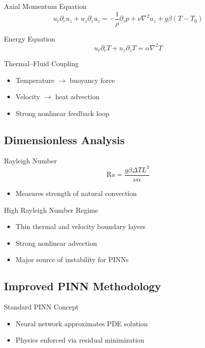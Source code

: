 \documentclass{beamer}
\begin{document}
\begin{frame}{Axial Momentum Equation}
\[
u_r \partial_r u_z + u_z \partial_z u_z =
-\frac{1}{\rho}\partial_z p
+ \nu\nabla^2 u_z
+ g\beta(T-T_0)
\]
\end{frame}

\begin{frame}{Energy Equation}
\[
u_r \partial_r T + u_z \partial_z T =
\alpha \nabla^2 T
\]
\end{frame}

\begin{frame}{Thermal--Fluid Coupling}
\begin{itemize}
\item Temperature $\rightarrow$ buoyancy force
\item Velocity $\rightarrow$ heat advection
\item Strong nonlinear feedback loop
\end{itemize}
\end{frame}

\subsection{Dimensionless Analysis}

\begin{frame}{Rayleigh Number}
\[
\mathrm{Ra} = \frac{g\beta \Delta T L^3}{\nu \alpha}
\]
\begin{itemize}
\item Measures strength of natural convection
\end{itemize}
\end{frame}

\begin{frame}{High Rayleigh Number Regime}
\begin{itemize}
\item Thin thermal and velocity boundary layers
\item Strong nonlinear advection
\item Major source of instability for PINNs
\end{itemize}
\end{frame}

\subsection{Improved PINN Methodology}

\begin{frame}{Standard PINN Concept}
\begin{itemize}
\item Neural network approximates PDE solution
\item Physics enforced via residual minimization
\end{itemize}
\end{frame}
\end{document}
